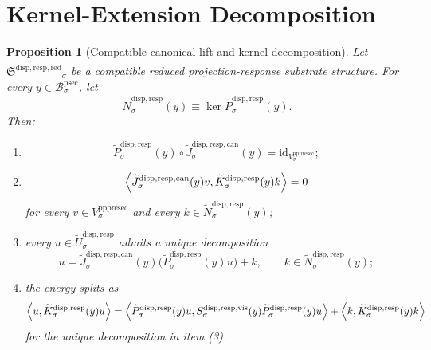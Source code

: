 \documentclass[11pt]{article}
\newcommand{\ProtoSectionBody}[1]{\mathcal B_{#1}^{\mathrm{psec}}}
\newcommand{\PrePreProtoSectionVertical}[1]{V_{#1}^{\mathrm{pppresec}}}
\newcommand{\ReducedStructure}{\mathfrak S^{\mathrm{disp,resp,red}}}
\newcommand{\VisibleResponseOperator}[1]{S_{#1}^{\mathrm{disp,resp,vis}}}
\newcommand{\CompatibleCarrier}[1]{\widetilde U_{#1}^{\mathrm{disp,resp}}}
\newcommand{\CompatibleProjection}[1]{\widetilde P_{#1}^{\mathrm{disp,resp}}}
\newcommand{\CompatibleOperator}[1]{\widetilde K_{#1}^{\mathrm{disp,resp}}}
\newcommand{\CompatibleKernel}[1]{\widetilde N_{#1}^{\mathrm{disp,resp}}}
\newcommand{\CompatibleLift}[1]{\widetilde J_{#1}^{\mathrm{disp,resp,can}}}
\newtheorem{proposition}{Proposition}
\begin{document}
\section{Kernel-Extension Decomposition}

\begin{proposition}[Compatible canonical lift and kernel decomposition]
\label{prop:decomp}
Let \(\widetilde{\ReducedStructure}_{\sigma}\) be a compatible reduced projection-response substrate structure. For every \(y\in\ProtoSectionBody{\sigma}\), let
\[
\CompatibleKernel{\sigma}(y)\equiv\ker\CompatibleProjection{\sigma}(y).
\]
Then:
\begin{enumerate}
    \item
    \[
    \CompatibleProjection{\sigma}(y)\circ\CompatibleLift{\sigma}(y)
    =
    \mathrm{id}_{\PrePreProtoSectionVertical{\sigma}};
    \]
    \item
    \[
    \ev{
    \CompatibleLift{\sigma}(y)v,
    \CompatibleOperator{\sigma}(y)k
    }
    =
    0
    \]
    for every \(v\in\PrePreProtoSectionVertical{\sigma}\) and every \(k\in\CompatibleKernel{\sigma}(y)\);
    \item every \(u\in\CompatibleCarrier{\sigma}\) admits a unique decomposition
    \[
    u
    =
    \CompatibleLift{\sigma}(y)\bigl(\CompatibleProjection{\sigma}(y)u\bigr)
    +
    k,
    \qquad
    k\in\CompatibleKernel{\sigma}(y);
    \]
    \item the energy splits as
    \begin{equation}
    \ev{u,\CompatibleOperator{\sigma}(y)u}
    =
    \ev{
    \CompatibleProjection{\sigma}(y)u,
    \VisibleResponseOperator{\sigma}(y)\CompatibleProjection{\sigma}(y)u
    }
    +
    \ev{k,\CompatibleOperator{\sigma}(y)k}
    \label{eq:split}
    \end{equation}
    for the unique decomposition in item (3).
\end{enumerate}
\end{proposition}
\end{document}
